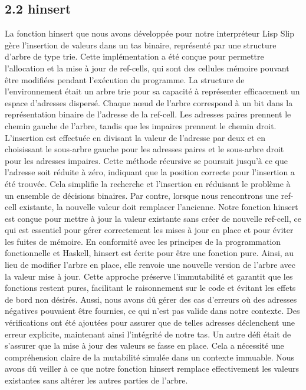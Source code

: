 \documentclass[10pt]{article}
\begin{document}
\subsection*{2.2 hinsert}
La fonction hinsert que nous avons développée pour notre interpréteur Lisp Slip gère l'insertion de valeurs dans un tas binaire, représenté par une structure d'arbre de type trie. Cette implémentation a été conçue pour permettre l'allocation et la mise à jour de ref-cells, qui sont des cellules mémoire pouvant être modifiées pendant l'exécution du programme. La structure de l'environnement était un arbre trie pour sa capacité à représenter efficacement un espace d'adresses dispersé. Chaque nœud de l'arbre correspond à un bit dans la représentation binaire de l'adresse de la ref-cell. Les adresses paires prennent le chemin gauche de l'arbre, tandis que les impaires prennent le chemin droit. L'insertion est effectuée en divisant la valeur de l'adresse par deux et en choisissant le sous-arbre gauche pour les adresses paires et le sous-arbre droit pour les adresses impaires. Cette méthode récursive se poursuit jusqu'à ce que l'adresse soit réduite à zéro, indiquant que la position correcte pour l'insertion a été trouvée. Cela simplifie la recherche et l'insertion en réduisant le problème à un ensemble de décisions binaires. Par contre, lorsque nous rencontrons une ref-cell existante, la nouvelle valeur doit remplacer l'ancienne. Notre fonction hinsert est conçue pour mettre à jour la valeur existante sans créer de nouvelle ref-cell, ce qui est essentiel pour gérer correctement les mises à jour en place et pour éviter les fuites de mémoire. En conformité avec les principes de la programmation fonctionnelle et Haskell, hinsert est écrite pour être une fonction pure. Ainsi, au lieu de modifier l'arbre en place, elle renvoie une nouvelle version de l'arbre avec la valeur mise à jour. Cette approche préserve l'immutabilité et garantit que les fonctions restent pures, facilitant le raisonnement sur le code et évitant les effets de bord non désirés. Aussi, nous avons dû gérer des cas d'erreurs où des adresses négatives pouvaient être fournies, ce qui n'est pas valide dans notre contexte. Des vérifications ont été ajoutées pour assurer que de telles adresses déclenchent une erreur explicite, maintenant ainsi l'intégrité de notre tas. Un autre défi était de s'assurer que la mise à jour des valeurs se fasse en place. Cela a nécessité une compréhension claire de la mutabilité simulée dans un contexte immuable. Nous avons dû veiller à ce que notre fonction hinsert remplace effectivement les valeurs existantes sans altérer les autres parties de l'arbre. 
\end{document}
